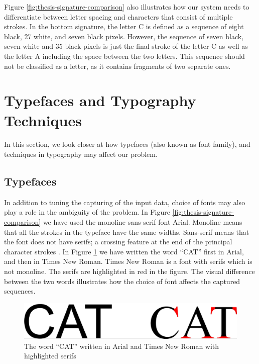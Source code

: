 Figure \ref{fig:thesis-signature-comparison} also illustrates how our system needs to differentiate between letter spacing and characters that consist of multiple strokes. In the bottom signature, the letter C is defined as a sequence of eight black, 27 white, and seven black pixels. However, the sequence of seven black, seven white and 35 black pixels is just the final stroke of the letter C as well as the letter A including the space between the two letters. This sequence should not be classified as a letter, as it contains fragments of two separate ones.


\section{Typefaces and Typography Techniques}
\label{sec:use_of_fonts}
In this section, we look closer at how typefaces (also known as font family), and techniques in typography may affect our problem.

\subsection{Typefaces}
In addition to tuning the capturing of the input data, choice of fonts may also play a role in the ambiguity of the problem. In Figure \ref{fig:thesis-signature-comparison} we have used the monoline sans-serif font Arial. Monoline means that all the strokes in the typeface have the same widths. Sans-serif means that the font does not have serifs; a crossing feature at the end of the principal character strokes \citep{felici2011complete}. In Figure \ref{fig:typeface-comparison} we have written the word ``CAT'' first in Arial, and then in Times New Roman. Times New Roman is a font with serifs which is not monoline. The serifs are highlighted in red in the figure. The visual difference between the two words illustrates how the choice of font affects the captured sequences.

\begin{figure}[h]
    \centering
    \captionsetup{justification=centering}
    \includegraphics[width=1.0\textwidth]{fig/chapter2/typeface_comparison.png}
    \caption{The word ``CAT'' written in Arial and Times New Roman with highlighted serifs}
    \label{fig:typeface-comparison}
\end{figure}

